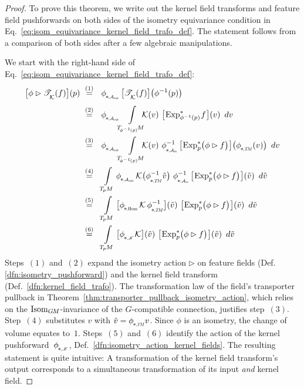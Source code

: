 \begin{proof}
    To prove this theorem, we write out the kernel field transforms and feature field pushforwards on both sides of the isometry equivariance condition in Eq.~\eqref{eq:isom_equivariance_kernel_field_trafo_def}.
    The statement follows from a comparison of both sides after a few algebraic manipulations.

    We start with the right-hand side of Eq.~\eqref{eq:isom_equivariance_kernel_field_trafo_def}:
    \begin{align}
        \big[ \phi \rhd \TK(f) \big](p)
        \ &\overset{(1)}{=}\ \ 
            \dphiAout \big[ \TK(f) \big] \big( \phi^{-1}(p) \big) \notag \\[1ex]
        \ &\overset{(2)}{=}\ \ 
            \dphiAout \mkern-8mu
            \int\limits_{T_{\!\phiinv\mkern-1mu(p)}\mkern-2muM}\!\!
            \mkern-6mu \K(v) \ 
            \big[\mkern-2mu \Expsphiinvpf \mkern1mu\big] (v)
            \,\ dv \notag \\
        \ &\overset{(3)}{=}\ \ 
            \dphiAout \mkern-8mu
            \int\limits_{T_{\!\phiinv\mkern-1mu(p)}\mkern-2muM}\!\!
            \mkern-6mu \K(v) \ 
            \dphiAin^{-1} \big[\mkern-2mu \Expsp\! \big(\phi \rhd f\big) \mkern1mu\big] \big( \dphiTM (v) \big)
            \,\ dv \notag \\
        \ &\overset{(4)}{=}\ \ 
            \int\limits_{\TpM}
            \dphiAout
            \K\big( \dphiTM^{-1} \tilde{v} \big) \ 
            \dphiAin^{-1} \big[\mkern-2mu \Expsp\! \big(\phi \rhd f\big) \mkern1mu\big] (\tilde{v})
            \,\ d\tilde{v} \notag \\
        \ &\overset{(5)}{=}\ \ 
            \int\limits_{\TpM}
            \big[ \dphiHom \K\, \dphiTM^{-1} \big] (\tilde{v}) \ 
            \big[\mkern-2mu \Expsp\! \big(\phi \rhd f\big) \mkern1mu\big] (\tilde{v})
            \,\ d\tilde{v} \notag \\
        \ &\overset{(6)}{=}\ \ 
            \int\limits_{\TpM}
            \big[ \dphiK \K \big] (\tilde{v}) \ 
            \big[\mkern-2mu \Expsp\! \big(\phi \rhd f\big) \mkern1mu\big] (\tilde{v})
            \,\ d\tilde{v}
    \end{align}
    Steps~$(1)$ and~$(2)$ expand the isometry action $\rhd$ on feature fields (Def.\ref{dfn:isometry_pushforward}) and the kernel field transform (Def.~\ref{dfn:kernel_field_trafo}).
    The transformation law of the field's transporter pullback in Theorem~\ref{thm:transporter_pullback_isometry_action}, which relies on the $\operatorname{Isom}_{G\mkern-1.4muM}$-invariance of the $G$-compatible connection, justifies step~$(3)$.
    Step~$(4)$ substitutes $v$ with $\tilde{v} = \dphiTM v$.
    Since $\phi$ is an isometry, the change of volume equates to~$1$.
    Steps~$(5)$ and~$(6)$ identify the action of the kernel pushforward~$\dphiK$, Def.~\ref{dfn:isometry_action_kernel_fields}.
    The resulting statement is quite intuitive:
    A transformation of the kernel field transform's output corresponds to a simultaneous transformation of its input \emph{and} kernel field.


\end{proof}
